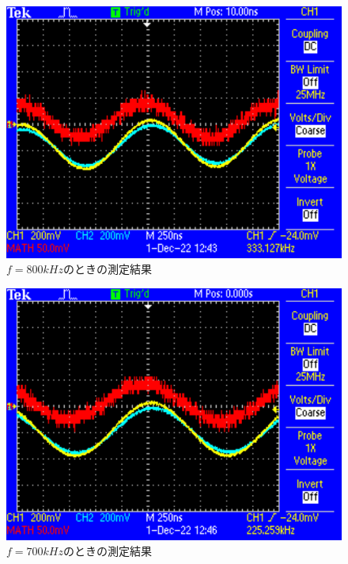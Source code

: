\begin{figure}[H]
    \centering
    \includegraphics[scale=0.5]{F0003.pdf}
    \caption{$f=800\si{kHz}$のときの測定結果}
\end{figure}

\begin{figure}[H]
    \centering
    \includegraphics[scale=0.5]{F0004.pdf}
    \caption{$f=700\si{kHz}$のときの測定結果}
\end{figure}

